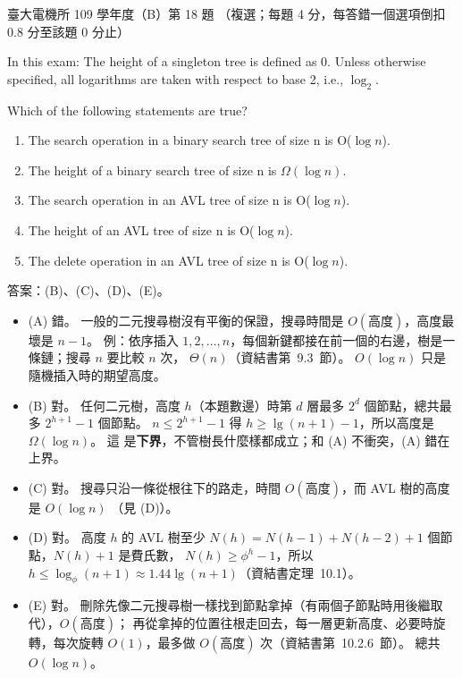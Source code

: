 \begin{pastexam}[label={px:ntu-109-ee-ds-18}]{臺大電機所 109 學年度（B）第 18 題}
（複選；每題 4 分，每答錯一個選項倒扣 0.8 分至該題 0 分止）

In this exam: The height of a singleton tree is defined as 0. Unless otherwise specified, all
logarithms are taken with respect to base 2, i.e., $\log_2$.

Which of the following statements are true?
\begin{enumerate}[label=(\Alph*)]
\item The search operation in a binary search tree of size n is O($\log n$).
\item The height of a binary search tree of size n is $\Omega(\log n)$.
\item The search operation in an AVL tree of size n is O($\log n$).
\item The height of an AVL tree of size n is O($\log n$).
\item The delete operation in an AVL tree of size n is O($\log n$).
\end{enumerate}
\end{pastexam}

\begin{pastsoln}
答案：(B)、(C)、(D)、(E)。

\begin{itemize}
\item (A) 錯。 一般的二元搜尋樹沒有平衡的保證，搜尋時間是 $O(\text{高度})$，高度最壞是 $n - 1$。
例：依序插入 $1, 2, \ldots, n$，每個新鍵都接在前一個的右邊，樹是一條鏈；搜尋 $n$ 要比較 $n$ 次，
$\Theta(n)$（資結書第~9.3~節）。 $O(\log n)$ 只是隨機插入時的期望高度。
\item (B) 對。 任何二元樹，高度 $h$（本題數邊）時第 $d$ 層最多 $2^d$ 個節點，總共最多
$2^{h+1} - 1$ 個節點。 $n \le 2^{h+1} - 1$ 得 $h \ge \lg(n+1) - 1$，所以高度是 $\Omega(\log n)$。 這
是\textbf{下界}，不管樹長什麼樣都成立；和 (A) 不衝突，(A) 錯在上界。
\item (C) 對。 搜尋只沿一條從根往下的路走，時間 $O(\text{高度})$，而 AVL 樹的高度是 $O(\log n)$
（見 (D)）。
\item (D) 對。 高度 $h$ 的 AVL 樹至少 $N(h) = N(h-1) + N(h-2) + 1$ 個節點，$N(h) + 1$ 是費氏數，
$N(h) \ge \phi^{h} - 1$，所以 $h \le \log_\phi(n + 1) \approx 1.44 \lg(n+1)$（資結書定理~10.1）。
\item (E) 對。 刪除先像二元搜尋樹一樣找到節點拿掉（有兩個子節點時用後繼取代），$O(\text{高度})$；
再從拿掉的位置往根走回去，每一層更新高度、必要時旋轉，每次旋轉 $O(1)$，最多做 $O(\text{高度})$
次（資結書第~10.2.6~節）。 總共 $O(\log n)$。
\end{itemize}
\end{pastsoln}
